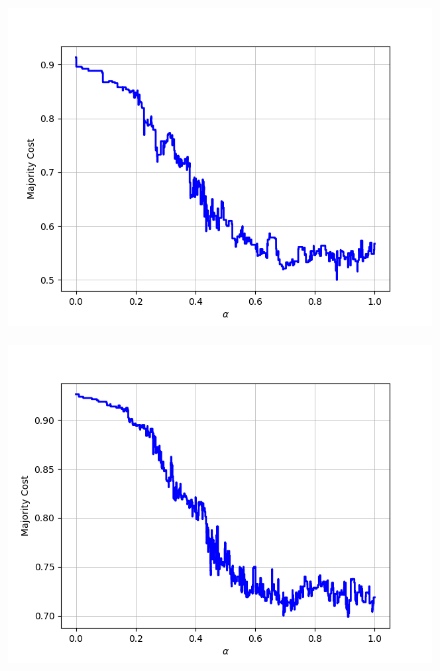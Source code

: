 \begin{figure}[H]\ContinuedFloat
\centering
\begin{minipage}{.24\textwidth}
  \centering
  {\includegraphics[width=\linewidth]{plots/omniglot-intra-sc-cnn/Korean}}
\end{minipage}
\begin{minipage}{.24\textwidth}
  \centering
  {\includegraphics[width=\linewidth]{plots/omniglot-intra-sc-cnn/Latin}}
\end{minipage}
\begin{minipage}{.24\textwidth}
  \centering

\end{minipage}
\end{figure}
